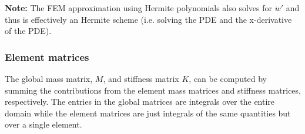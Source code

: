 \documentclass[11pt]{article}
\begin{document}
{\bf Note:} The FEM approximation using Hermite polynomials also solves for $\ddot w'$ and thus is effectively
an Hermite scheme (i.e. solving the PDE and the x-derivative of the PDE).

\subsubsection{Element matrices}

The global mass matrix, $M$, and stiffness matrix $K$, can be computed by summing the contributions
from the element mass matrices and stiffness matrices, respectively. The entries in the global matrices are
integrals over the entire domain while the element matrices are just integrals of the same quantities but over a single element.
\end{document}
